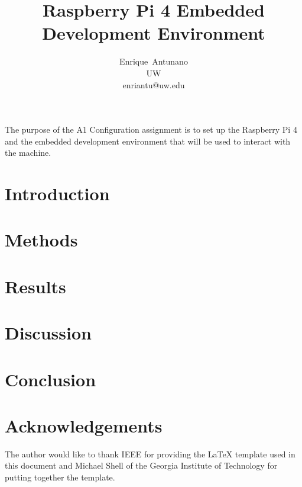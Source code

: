 \documentclass[journal]{IEEEtran}
\begin{document}
    \title{Raspberry Pi 4 Embedded Development Environment}

    \author{Enrique~Antunano\\UW\\enriantu@uw.edu}


    \maketitle

    \begin{abstract}

    \end{abstract}
    The purpose of the A1 Configuration assignment is to set up the Raspberry Pi 4 and the embedded development environment that will be used to interact with the machine. 
    \section{Introduction}

    \section{Methods}

    \section{Results}

    \section{Discussion}

    \section{Conclusion}

    \nocite{*}
    \newpage

    
    

    \newpage
    \section{Acknowledgements}
    The author would like to thank IEEE for providing the LaTeX template used in this document and Michael Shell of the Georgia Institute of Technology for putting together the template.
\end{document}
